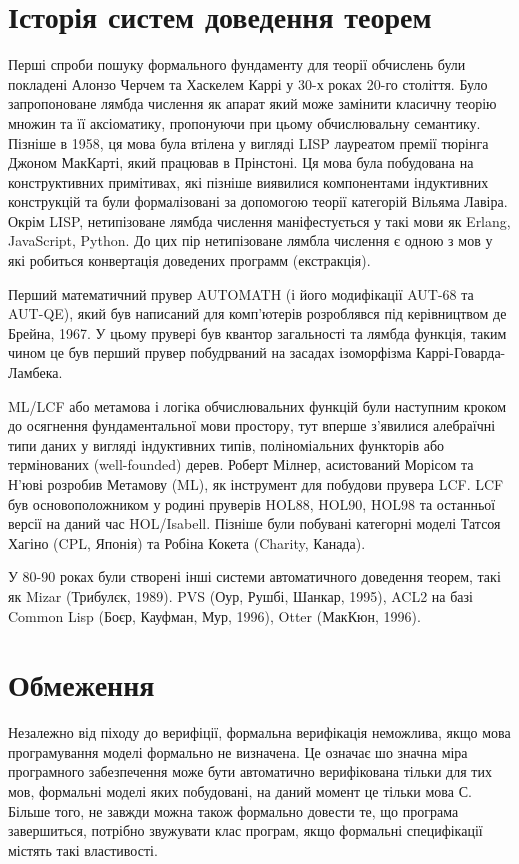 \section{Історія систем доведення теорем}
Перші спроби пошуку формального фундаменту для теорії обчислень були покладені
Алонзо Черчем та Хаскелем Каррі у 30-х роках 20-го століття. Було запропоноване
лямбда числення як апарат який може замінити класичну теорію множин та її аксіоматику,
пропонуючи при цьому обчислювальну семантику. Пізніше в 1958, ця мова була втілена
у вигляді LISP лауреатом премії тюрінга Джоном МакКарті, який працював в Прінстоні.
Ця мова була побудована на конструктивних примітивах, які пізніше виявилися компонентами
індуктивних конструкцій та були формалізовані за допомогою
теорії категорій Вільяма Лавіра. Окрім LISP, нетипізоване лямбда числення
маніфестується у такі мови як Erlang, JavaScript, Python.
До цих пір нетипізоване лямбла числення є одною з мов у які робиться
конвертація доведених программ (екстракція).

Перший математичний прувер AUTOMATH (і його модифікації AUT-68 та AUT-QE),
який був написаний для комп'ютерів розроблявся під керівництвом де Брейна, 1967.
У цьому прувері був квантор загальності та лямбда функція, таким чином це був перший прувер
побудрваний на засадах ізоморфізма Каррі-Говарда-Ламбека.

ML/LCF або метамова і логіка обчислювальних функцій були наступним кроком до
осягнення фундаментальної мови простору, тут вперше з'явилися алебраїчні типи даних
у вигляді індуктивних типів, поліноміальних функторів або термінованих (well-founded) дерев.
Роберт Мілнер, асистований Морісом та Н'юві розробив Метамову (ML), як
інструмент для побудови прувера LCF. LCF був основоположником у родині пруверів
HOL88, HOL90, HOL98 та останньої версії на даний час HOL/Isabell.
Пізніше були побувані категорні моделі Татсоя Хагіно (CPL, Японія)
та Робіна Кокета (Charity, Канада).

У 80-90 роках були створені інші системи автоматичного доведення теорем,
такі як Mizar (Трибулєк, 1989). PVS (Оур, Рушбі, Шанкар, 1995),
ACL2 на базі Common Lisp (Боєр, Кауфман, Мур, 1996), Otter (МакКюн, 1996).

\section{Обмеження}
Незалежно від піходу до верифіції, формальна верифікація неможлива,
якщо мова програмування моделі формально не визначена. Це означає шо значна міра
програмного забезпечення може бути автоматично верифікована тільки для тих мов,
формальні моделі яких побудовані, на даний момент це тільки мова С.
Більше того, не завжди можна також формально довести те, що програма завершиться,
потрібно звужувати клас програм, якщо формальні специфікації містять такі властивості.

